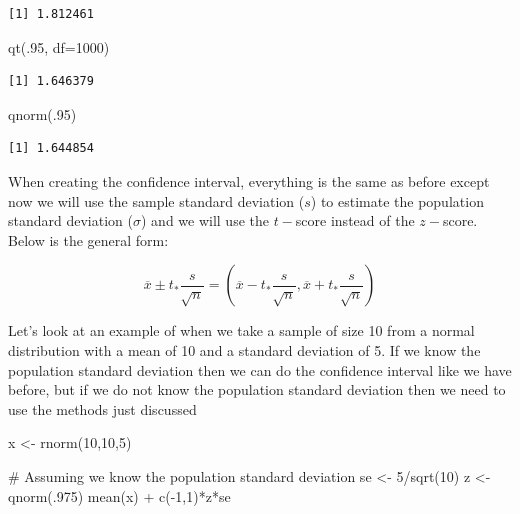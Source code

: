 \documentclass[
  letterpaper,
  DIV=11,
  numbers=noendperiod]{scrreprt}
\newenvironment{Shaded}{\begin{snugshade}}{\end{snugshade}}
\newcommand{\AttributeTok}[1]{\textcolor[rgb]{0.40,0.45,0.13}{#1}}
\newcommand{\CommentTok}[1]{\textcolor[rgb]{0.37,0.37,0.37}{#1}}
\newcommand{\DecValTok}[1]{\textcolor[rgb]{0.68,0.00,0.00}{#1}}
\newcommand{\FunctionTok}[1]{\textcolor[rgb]{0.28,0.35,0.67}{#1}}
\newcommand{\NormalTok}[1]{\textcolor[rgb]{0.00,0.23,0.31}{#1}}
\newcommand{\OtherTok}[1]{\textcolor[rgb]{0.00,0.23,0.31}{#1}}
\newcommand{\SpecialCharTok}[1]{\textcolor[rgb]{0.37,0.37,0.37}{#1}}
\begin{document}
\begin{verbatim}
[1] 1.812461
\end{verbatim}

\begin{Shaded}
\begin{Highlighting}[]
\FunctionTok{qt}\NormalTok{(.}\DecValTok{95}\NormalTok{, }\AttributeTok{df=}\DecValTok{1000}\NormalTok{)}
\end{Highlighting}
\end{Shaded}

\begin{verbatim}
[1] 1.646379
\end{verbatim}

\begin{Shaded}
\begin{Highlighting}[]
\FunctionTok{qnorm}\NormalTok{(.}\DecValTok{95}\NormalTok{)}
\end{Highlighting}
\end{Shaded}

\begin{verbatim}
[1] 1.644854
\end{verbatim}

When creating the confidence interval, everything is the same as before
except now we will use the sample standard deviation (\(s\)) to estimate
the population standard deviation (\(\sigma\)) and we will use the
\(t-\)score instead of the \(z-\)score. Below is the general form:

\[ \overline{x} \pm t_*\frac{s}{\sqrt{n}} = \left(\overline{x} - t_*\frac{s}{\sqrt{n}},\overline{x} + t_*\frac{s}{\sqrt{n}}\right) \]

Let's look at an example of when we take a sample of size 10 from a
normal distribution with a mean of 10 and a standard deviation of 5. If
we know the population standard deviation then we can do the confidence
interval like we have before, but if we do not know the population
standard deviation then we need to use the methods just discussed

\begin{Shaded}
\begin{Highlighting}[]
\NormalTok{x }\OtherTok{\textless{}{-}} \FunctionTok{rnorm}\NormalTok{(}\DecValTok{10}\NormalTok{,}\DecValTok{10}\NormalTok{,}\DecValTok{5}\NormalTok{)}

\CommentTok{\# Assuming we know the population standard deviation}
\NormalTok{se }\OtherTok{\textless{}{-}} \DecValTok{5}\SpecialCharTok{/}\FunctionTok{sqrt}\NormalTok{(}\DecValTok{10}\NormalTok{)}
\NormalTok{z }\OtherTok{\textless{}{-}} \FunctionTok{qnorm}\NormalTok{(.}\DecValTok{975}\NormalTok{)}
\FunctionTok{mean}\NormalTok{(x) }\SpecialCharTok{+} \FunctionTok{c}\NormalTok{(}\SpecialCharTok{{-}}\DecValTok{1}\NormalTok{,}\DecValTok{1}\NormalTok{)}\SpecialCharTok{*}\NormalTok{z}\SpecialCharTok{*}\NormalTok{se}
\end{Highlighting}
\end{Shaded}
\end{document}
